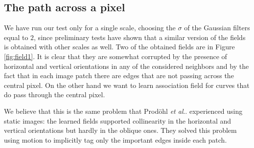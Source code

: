 \documentclass{llncs}
\makeatletter
\DeclareRobustCommand\onedot{\futurelet\@let@token\@onedot}
\def\@onedot{\ifx\@let@token.\else.\null\fi\xspace}
\def\etal{\emph{et al}\onedot}
\makeatother
\begin{document}
\subsection{The path across a pixel}
\label{sec:ass_pre_res}
We have run our test only for a single scale, choosing the $\sigma$ of the Gaussian filters
equal to $2$, since preliminary tests have shown that a similar version of the fields is obtained with other scales as well.
Two of the obtained fields are in Figure \ref{fig:field1}. It is clear that they are somewhat corrupted by the presence of horizontal and vertical orientations in any of the considered neighbors and by the fact that
in each image patch there are edges
that are not passing across the central pixel. On the other hand we want to learn association field for curves that do pass through the central pixel.



We believe that this is the same problem that Prod\"ohl \etal \cite{Prodohl01} experienced using static images: the learned fields supported collinearity in the horizontal and vertical orientations but hardly in the oblique ones. They solved this problem using motion to implicitly tag only the important edges inside each patch.
\end{document}
